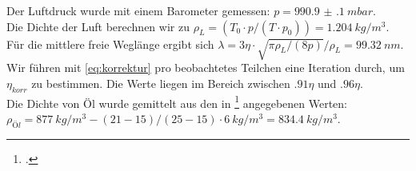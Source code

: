 Der Luftdruck wurde mit einem Barometer gemessen: $p=\SI{990.9(1)}{mbar}$.\\

Die Dichte der Luft berechnen wir zu $\rho_L=(T_0\cdot p/(T\cdot p_0))=\SI{1.204}{kg/m^3}$.\\

Für die mittlere freie Weglänge ergibt sich $\lambda=3\eta \cdot \sqrt{\pi \rho_L/(8p)}/\rho_L=\SI{99.32}{nm}$. \\

Wir führen mit \cref{eq:korrektur} pro beobachtetes Teilchen eine Iteration durch, um $\eta_{korr}$ zu bestimmen. Die Werte liegen im Bereich zwischen $\num{.91}\eta$ und $\num{.96}\eta$. \\

Die Dichte von Öl wurde gemittelt aus den in \footcite{anleitung-ws2014} angegebenen Werten: $\rho_{Öl}=\SI{877}{kg/m^3}-(21-15)/(25-15)\cdot \SI{6}{kg/m^3}=\SI{834.4}{kg/m^3}$. \\

